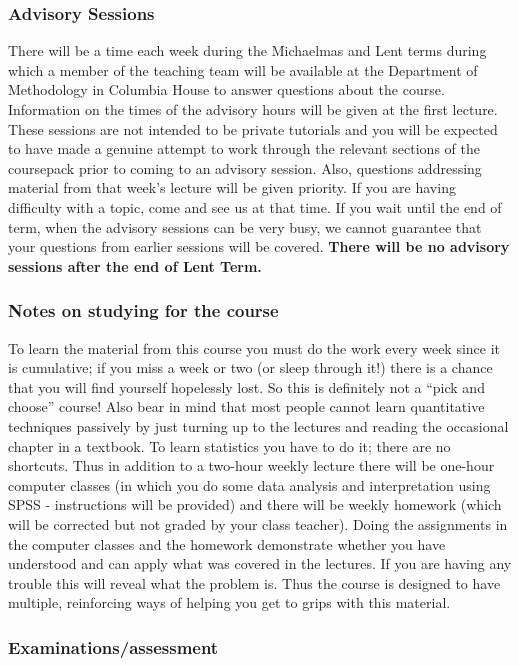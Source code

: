 \subsubsection{Advisory Sessions}
There will be a time each week during the Michaelmas and Lent terms during which a
member of the teaching team will be available at the Department of
Methodology in Columbia House to answer
questions about the course. Information on the times of the advisory
hours will be given at the first lecture. These sessions are not
intended to be private tutorials and you will be expected to have made a
genuine attempt to work through the relevant sections of the coursepack
prior to coming to an advisory session. Also, questions addressing
material from that week's lecture will be given priority.  If you are
having difficulty with a topic, come and see us at that time. If you
wait until the end of term, when the advisory sessions can be very busy,
we cannot guarantee that your questions from earlier sessions will be
covered.  \textbf{There will be no advisory sessions after the end of
Lent Term.}

\subsubsection{Notes on studying for the course}
To learn the material from this course you must do the work every week
since it is cumulative; if you miss a week or two (or sleep through it!)
there is a chance that you will find yourself hopelessly lost. So this
is definitely not a ``pick and choose'' course!  Also bear in mind that
most people cannot learn quantitative techniques passively by just
turning up to the lectures and reading the occasional chapter in a
textbook.  To learn statistics you have to do it; there are no
shortcuts. Thus in addition to a two-hour weekly lecture there will be
one-hour computer classes (in which you do some data analysis and
interpretation using SPSS - instructions will be provided) and there
will be weekly homework (which will be corrected but not graded by your
class teacher). Doing the assignments in the computer classes and the
homework demonstrate whether you have understood and can apply what was
covered in the lectures.  If you are having any trouble this will reveal
what the problem is.  Thus the course is designed to have multiple,
reinforcing ways of helping you get to grips with this material.


\subsubsection{Examinations/assessment}

